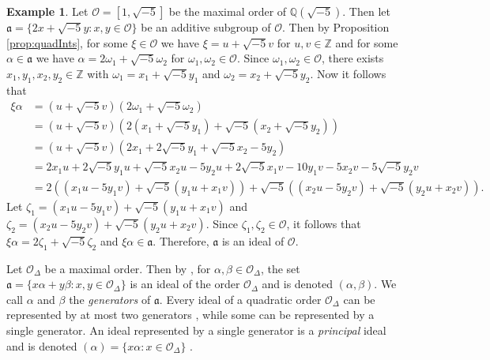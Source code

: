 \documentclass{ucalgthes1}
\theoremstyle{definition}
\newtheorem{defn}[thm]{Definition}
\newtheorem{example}[thm]{Example}
\newcommand{\ZZ}{\mathbb{Z}}
\newcommand{\QQ}{\mathbb{Q}}
\newcommand{\OO}{\mathcal{O}}
\newcommand{\ideal}{\mathfrak}
\begin{document}
\begin{example}
Let $\OO = [1, \sqrt{-5}]$ be the maximal order of $\QQ(\sqrt{-5})$.  Then let $\ideal a = \{2 x + \sqrt{-5} y : x, y \in \OO\}$ be an additive subgroup of $\OO$.  Then by Proposition \ref{prop:quadInts}, for some $\xi \in \OO$ we have $\xi = u + \sqrt{-5} v$ for $u,v \in \ZZ$ and for some $\alpha \in \ideal a$ we have $\alpha = 2 \omega_1 + \sqrt{-5} \omega_2$ for $\omega_1, \omega_2 \in \OO$.  Since $\omega_1, \omega_2 \in \OO$, there exists $x_1, y_1, x_2, y_2 \in \ZZ$ with $\omega_1 = x_1 + \sqrt{-5} y_1$ and $\omega_2 = x_2 + \sqrt{-5} y_2$.  Now it follows that
\begin{align*}
\xi \alpha &= (u + \sqrt{-5} v)(2 \omega_1 + \sqrt{-5} \omega_2) \\
&= (u + \sqrt{-5} v)(2 (x_1 + \sqrt{-5} y_1) + \sqrt{-5} (x_2 + \sqrt{-5} y_2)) \\
&= (u + \sqrt{-5} v)(2 x_1 + 2 \sqrt{-5} y_1 + \sqrt{-5} x_2 - 5 y_2) \\
&= 2 x_1 u + 2 \sqrt{-5} y_1 u + \sqrt{-5} x_2 u - 5 y_2 u
 + 2 \sqrt{-5} x_1 v - 10 y_1 v - 5 x_2 v - 5 \sqrt{-5} y_2 v \\
&= 2 ((x_1 u - 5 y_1 v) + \sqrt{-5} (y_1u + x_1v)) + \sqrt{-5} ((x_2 u - 5 y_2 v) + \sqrt{-5} (y_2 u + x_2 v)).
\end{align*}
Let $\zeta_1 = (x_1 u - 5 y_1 v) + \sqrt{-5} (y_1u + x_1v)$ and $\zeta_2 = (x_2 u - 5 y_2 v) + \sqrt{-5} (y_2 u + x_2 v)$.  Since $\zeta_1, \zeta_2 \in \OO$, it follows that $\xi \alpha = 2 \zeta_1 + \sqrt{-5} \zeta_2$ and $\xi \alpha \in \ideal a$.  Therefore, $\ideal a$ is an ideal of $\OO$.
\end{example}


Let $\OO_\Delta$ be a maximal order.  Then by \cite[p.16]{Ramachandran2006}, for $\alpha, \beta \in \OO_\Delta$, the set $\ideal a = \{x \alpha + y \beta : x, y \in \OO_\Delta\}$ is an ideal of the order $\OO_\Delta$ and is denoted $(\alpha, \beta)$.  We call $\alpha$ and $\beta$ the \emph{generators} of $\ideal a$.  Every ideal of a quadratic order $\OO_\Delta$ can be represented by at most two generators \cite[p.125--126]{Cohn1980}, while some can be represented by a single generator.  An ideal represented by a single generator is a \emph{principal} ideal and is denoted $(\alpha) = \{ x \alpha : x \in \OO_\Delta \}$ \cite[p.87]{Jacobson2009}.
\end{document}
